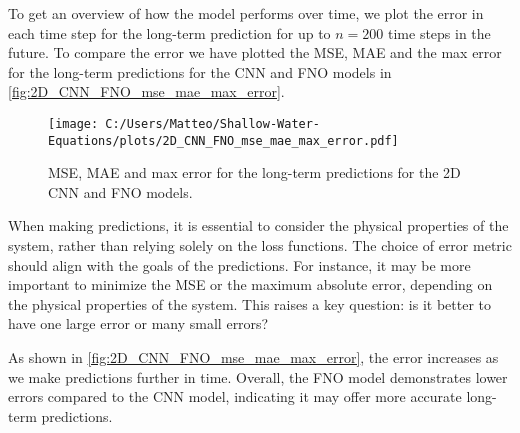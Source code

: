 To get an overview of how the model performs over time, we plot the error in each time step for the long-term prediction for up to $n = 200$ time steps in the future.
To compare the error we have plotted the MSE, MAE and the max error for the long-term predictions for the CNN and FNO models in \autoref{fig:2D_CNN_FNO_mse_mae_max_error}.
\begin{figure}[H]
    \centering
    \texttt{[image: C:/Users/Matteo/Shallow-Water-Equations/plots/2D\_CNN\_FNO\_mse\_mae\_max\_error.pdf]}
    \caption{MSE, MAE and max error for the long-term predictions for the 2D CNN and FNO models.}\label{fig:2D_CNN_FNO_mse_mae_max_error}
\end{figure}
When making predictions, it is essential to consider the physical properties of the system, rather than relying solely on the loss functions.
The choice of error metric should align with the goals of the predictions.
For instance, it may be more important to minimize the MSE or the maximum absolute error, depending on the physical properties of the system.
This raises a key question: is it better to have one large error or many small errors?

As shown in \autoref{fig:2D_CNN_FNO_mse_mae_max_error}, the error increases as we make predictions further in time.
Overall, the FNO model demonstrates lower errors compared to the CNN model, indicating it may offer more accurate long-term predictions.











